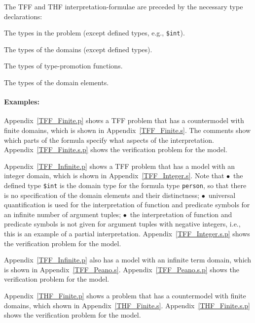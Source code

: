 \documentclass{easychair}
\newcommand{\smalltt}[1]{\small \texttt{#1}}
\newenvironment{packed_itemize}{
\vspace*{-0.3em}
\begin{itemize}
\setlength{\partopsep}{0pt}
\setlength{\itemsep}{1pt}
\setlength{\parskip}{0pt}
\setlength{\parsep}{0pt}
}{\end{itemize}}
\begin{document}
\vspace*{0.5em}
The TFF and THF interpretation-formulae are preceded by the necessary type declarations:
\begin{packed_itemize}
\item The types in the problem (except defined types, e.g., {\smalltt{\$int}}).
\item The types of the domains (except defined types).
\item The types of type-promotion functions.
\item The types of the domain elements.
\end{packed_itemize}

\paragraph{Examples:}
\begin{packed_itemize}
\item Appendix~\ref{TFF_Finite.p} shows a TFF problem that has a countermodel with finite domains,
      which is shown in Appendix~\ref{TFF_Finite.s}.
      The comments show which parts of the formula specify what aspects of the interpretation.
      Appendix~\ref{TFF_Finite.s.p} shows the verification problem for the model.
\item Appendix~\ref{TFF_Infinite.p} shows a TFF problem that has a model with an integer domain,
      which is shown in Appendix~\ref{TFF_Integer.s}.
      Note that $\bullet$~the defined type {\smalltt{\$int}} is the domain type for the formula 
      type {\smalltt{person}}, so that there is no specification of the domain elements and their 
      distinctness; $\bullet$~universal quantification is used for the interpretation of function 
      and predicate symbols for an infinite number of argument tuples; $\bullet$~the 
      interpretation of function and predicate symbols is not given for argument tuples with 
      negative integers, i.e., this is an example of a partial interpretation.
      Appendix~\ref{TFF_Integer.s.p} shows the verification problem for the model.
\item Appendix~\ref{TFF_Infinite.p} also has a model with an infinite term domain, which is
      shown in Appendix~\ref{TFF_Peano.s}.
      Appendix~\ref{TFF_Peano.s.p} shows the verification problem for the model.
\item Appendix~\ref{THF_Finite.p} shows a problem that has a countermodel with finite domains,
      which shown in Appendix~\ref{THF_Finite.s}.
      Appendix~\ref{THF_Finite.s.p} shows the verification problem for the model.
\end{packed_itemize}
\end{document}
